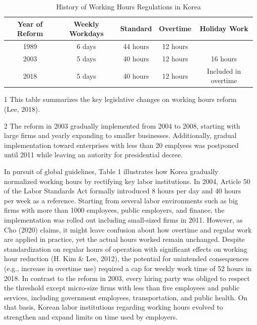 \documentclass[
  12pt,
]{article}
\begin{document}
\begin{table}[!h]
\centering\centering
\caption{\label{tab:unnamed-chunk-4}History of Working Hours Regulations in Korea}
\centering
\fontsize{11}{13}\selectfont
\begin{threeparttable}
\begin{tabular}[t]{ccccc}
\toprule
Year of Reform & Weekly Workdays & Standard & Overtime & Holiday Work\\
\midrule
1989 & 6 days & 44 hours & 12 hours & \\
2003 & 5 days & 40 hours & 12 hours & 16 hours\\
2018 & 5 days & 40 hours & 12 hours & Included in overtime\\
\bottomrule
\end{tabular}
\begin{tablenotes}
\item[1] This table summarizes the key legislative changes on working hours reform (Lee, 2018).
\item[2] The reform in 2003 gradually implemented from 2004 to 2008, starting with large firms and yearly expanding to smaller businesses. Additionally, gradual implementation toward enterprises with less than 20 emplyees was postponed until 2011 while leaving an autority for presidential decree.
\end{tablenotes}
\end{threeparttable}
\end{table}

In pursuit of global guidelines, Table 1 illustrates how Korea gradually
normalized working hours by rectifying key labor institutions. In 2004,
Article 50 of the Labor Standards Act formally introduced 8 hours per
day and 40 hours per week as a reference. Starting from several labor
environments such as big firms with more than 1000 employees, public
employers, and finance, the implementation was rolled out including
small-sized firms in 2011. However, as Cho (2020) claims, it might leave
confusion about how overtime and regular work are applied in practice,
yet the actual hours worked remain unchanged. Despite standardization on
regular hours of operation with significant effects on working hour
reduction (H. Kim \& Lee, 2012), the potential for unintended
consequences (e.g., increase in overtime use) required a cap for weekly
work time of 52 hours in 2018. In contrast to the reform in 2003, every
hiring party was obliged to respect the threshold except micro-size
firms with less than five employees and public services, including
government employees, transportation, and public health. On that basis,
Korean labor institutions regarding working hours evolved to strengthen
and expand limits on time used by employers.
\end{document}

